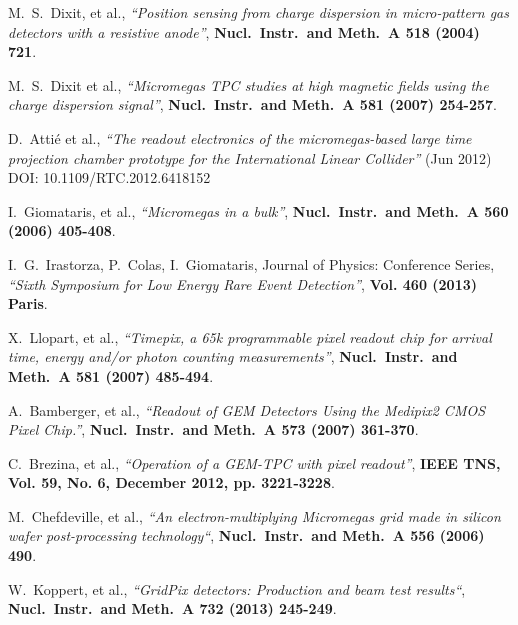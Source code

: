 \begin{thebibliography}{9}
M.~S.~Dixit, et al., \textit{``Position sensing from charge dispersion in micro-pattern gas detectors with a resistive anode''}, \textbf{Nucl.~Instr.~and Meth.~A 518 (2004) 721}.

M.~S.~Dixit et al., \textit{``Micromegas TPC studies at high magnetic fields using the charge dispersion signal''}, \textbf{Nucl.~Instr.~and Meth.~A 581 (2007) 254-257}.

D.~Atti{\'e} et al., \textit{``The readout electronics of the micromegas-based large time projection chamber prototype for the International Linear Collider''} (Jun 2012) DOI: 10.1109/RTC.2012.6418152

I.~Giomataris, et al., \textit{``Micromegas in a bulk''}, \textbf{Nucl.~Instr.~and Meth.~A 560 (2006) 405-408}.

I.~G.~Irastorza, P.~Colas, I.~Giomataris, Journal of Physics: Conference Series, \textit{``Sixth Symposium for Low Energy Rare Event Detection''}, \textbf{Vol. 460 (2013) Paris}.





 X.~Llopart, et al., \textit{``Timepix, a 65k
  programmable pixel readout chip for arrival time, energy and/or photon
  counting measurements''}, \textbf{Nucl.~Instr.~and Meth.~A 581 (2007) 485-494}.



 A.~Bamberger, et al., \textit{``Readout of GEM Detectors Using the Medipix2 CMOS Pixel Chip.''}, \textbf{Nucl.~Instr.~and Meth.~A 573 (2007) 361-370}.



 C.~Brezina, et al., \textit{``Operation of a GEM-TPC with pixel readout''}, \textbf{IEEE TNS, Vol. 59, No. 6, December 2012, pp. 3221-3228}.



 M.~Chefdeville, et al., \textit{``An electron-multiplying Micromegas grid made in silicon wafer post-processing technology``}, \textbf{Nucl.~Instr.~and Meth.~A 556 (2006) 490}.



 W.~Koppert, et al., \textit{``GridPix detectors: Production and beam test results``}, \textbf{Nucl.~Instr.~and Meth.~A 732 (2013) 245-249}.




\end{thebibliography}
